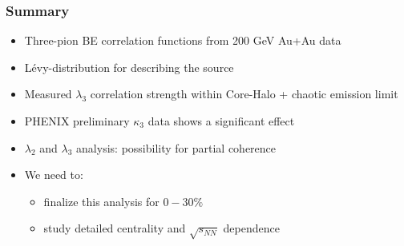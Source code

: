 \documentclass{beamer}
\begin{document}
\begin{frame}
\frametitle{Summary}
\begin{itemize}
\setlength{\itemsep}{14pt}
\item Three-pion BE correlation functions from 200 GeV Au+Au data
\item Lévy-distribution for describing the source
\item Measured $\lambda_3$ correlation strength within Core-Halo + chaotic emission limit
\item PHENIX preliminary $\kappa_3$ data shows a significant effect
\item $\lambda_2$ and $\lambda_3$ analysis: possibility for partial coherence
\item We need to:
\begin{itemize}
\item finalize this analysis for $0-30\%$
\item study detailed centrality and $\sqrt{s_{NN}}$ dependence
\end{itemize}
\end{itemize}
\end{frame}
\end{document}
